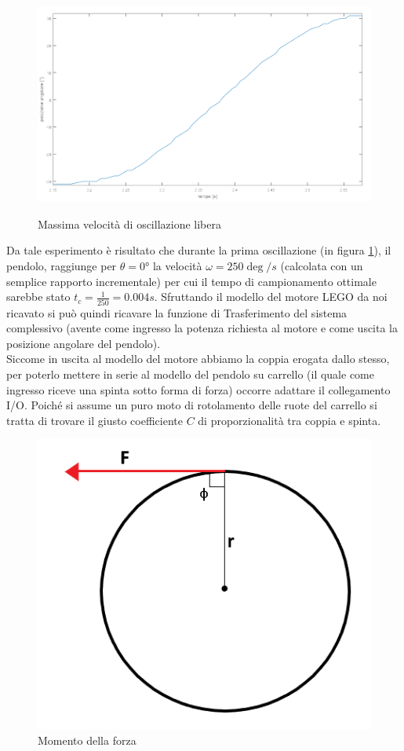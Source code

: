 \begin{figure}[ht]
	\centering
	\includegraphics[width=\textwidth]{SlewRate.PNG}\\
	\caption{Massima velocità di oscillazione libera}
	\label{slewRate}
\end{figure}
Da tale esperimento è risultato che durante la prima oscillazione (in figura \ref{slewRate}), il pendolo, raggiunge per $\theta=\ang{0}$ la velocità $\omega=250\deg/s$ (calcolata con un semplice rapporto incrementale) per cui il tempo di campionamento ottimale sarebbe stato $t_c=\displaystyle\frac{1}{250}=0.004s$.
Sfruttando il modello del motore LEGO da noi ricavato si può quindi ricavare la funzione di Trasferimento del sistema complessivo (avente come ingresso la potenza richiesta al motore e come uscita la posizione angolare del pendolo).\\
Siccome in uscita al modello del motore abbiamo la coppia erogata dallo stesso, per poterlo mettere in serie al modello del pendolo su carrello (il quale come ingresso riceve una spinta sotto forma di forza) occorre adattare il collegamento I/O. Poiché si assume un puro moto di rotolamento delle ruote del carrello si tratta di trovare il giusto coefficiente $C$ di proporzionalità tra coppia e spinta.
\begin{figure}[ht]
	\centering
	\includegraphics[scale=0.4]{braccioForza.PNG}
	\caption{Momento della forza}
	\label{braccioForza}
\end{figure}

